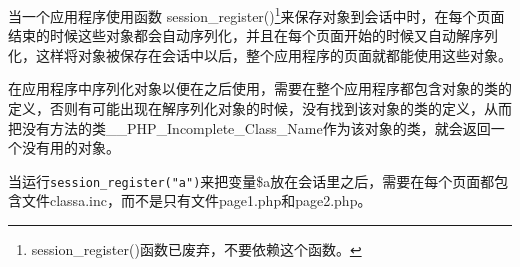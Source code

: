 当一个应用程序使用函数 session\_register()\footnote{session\_register()函数已废弃，不要依赖这个函数。}来保存对象到会话中时，在每个页面结束的时候这些对象都会自动序列化，并且在每个页面开始的时候又自动解序列化，这样将对象被保存在会话中以后，整个应用程序的页面就都能使用这些对象。



在应用程序中序列化对象以便在之后使用，需要在整个应用程序都包含对象的类的定义，否则有可能出现在解序列化对象的时候，没有找到该对象的类的定义，从而把没有方法的类\_\_PHP\_Incomplete\_Class\_Name作为该对象的类，就会返回一个没有用的对象。

当运行\texttt{session\_register("a")}来把变量\$a放在会话里之后，需要在每个页面都包含文件classa.inc，而不是只有文件page1.php和page2.php。




\clearpage

